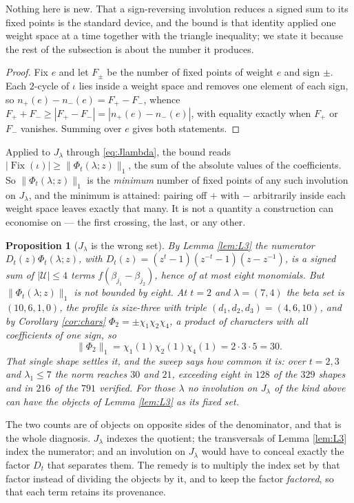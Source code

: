 \documentclass[11pt,reqno]{amsart}
\newcommand{\stverif}{\textcolor{hverif}{\small verified}}
\theoremstyle{plain}
\newtheorem{proposition}[theorem]{Proposition}
\theoremstyle{definition}
\newcommand{\Fix}{\operatorname{Fix}}
\begin{document}
\noindent Nothing here is new. That a sign-reversing involution reduces a signed sum to its fixed
points is the standard device, and the bound is that identity applied one weight space at a time
together with the triangle inequality; we state it because the rest of the subsection is about the
number it produces.

\begin{proof}
Fix $e$ and let $F_\pm$ be the number of fixed points of weight $e$ and sign $\pm$. Each $2$-cycle of
$\iota$ lies inside a weight space and removes one element of each sign, so
$n_+(e)-n_-(e)=F_+-F_-$, whence $F_++F_-\ge|F_+-F_-|=|n_+(e)-n_-(e)|$, with equality exactly when
$F_+$ or $F_-$ vanishes. Summing over $e$ gives both statements.
\end{proof}

Applied to $J_\lambda$ through \eqref{eq:Jlambda}, the bound reads
$|\Fix(\iota)|\ge\|\Phi_t(\lambda;z)\|_1$, the sum of the absolute values of the coefficients. So
$\|\Phi_t(\lambda;z)\|_1$ is the \emph{minimum} number of fixed points of any such involution on
$J_\lambda$, and the minimum is attained: pairing off $+$ with $-$ arbitrarily inside each weight
space leaves exactly that many. It is not a quantity a construction can economise on --- the first
crossing, the last, or any other.

\begin{proposition}[$J_\lambda$ is the wrong set]\label{prop:wrongset}
By Lemma \ref{lem:L3} the numerator $D_t(z)\Phi_t(\lambda;z)$, with
$D_t(z)=(z^t-1)(z^{-t}-1)(z-z^{-1})$, is a signed sum of $|\mathcal U|\le4$ terms
$f(\beta_{j_1}-\beta_{j_2})$, hence of at most eight monomials. But $\|\Phi_t(\lambda;z)\|_1$ is not
bounded by eight. At $t=2$ and $\lambda=(7,4)$ the beta set is $(10,6,1,0)$, the profile is
size-three with triple $(d_1,d_2,d_3)=(4,6,10)$, and by Corollary \ref{cor:chars}
$\Phi_2=\pm\chi_1\chi_2\chi_4$, a product of characters with all coefficients of one sign, so
\[
\|\Phi_2\|_1=\chi_1(1)\chi_2(1)\chi_4(1)=2\cdot3\cdot5=30 .
\]
That single shape settles it, and the sweep says how common it is: over $t=2,3$ and
$\lambda_1\le7$ the norm reaches $30$ and $21$, exceeding eight in $128$ of the $329$ shapes and in
$216$ of the $791$ \stverif. For those $\lambda$ no involution on $J_\lambda$ of the kind above can
have the objects of Lemma \ref{lem:L3} as its fixed set.
\end{proposition}

The two counts are of objects on opposite sides of the denominator, and that is the whole diagnosis.
$J_\lambda$ indexes the quotient; the transversals of Lemma \ref{lem:L3} index the numerator; and an
involution on $J_\lambda$ would have to conceal exactly the factor $D_t$ that separates them. The
remedy is to multiply the index set by that factor instead of dividing the objects by it, and to
keep the factor \emph{factored}, so that each term retains its provenance.
\end{document}
